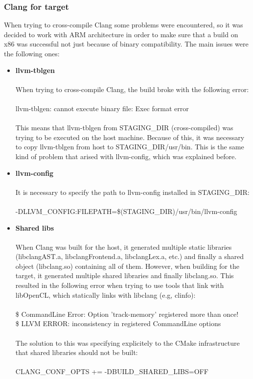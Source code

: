 \documentclass[12pt,a4paper,oneside]{article}
\begin{document}
\newpage
\subsubsection*{Clang for target}
When trying to cross-compile Clang some problems were encountered, so it was
decided to work with ARM architecture in order to make sure that a build on x86
was successful not just because of binary compatibility. The main issues were the
following ones:
\begin{itemize}
  \item \textbf{llvm-tblgen}\\\\
  When trying to cross-compile Clang, the build broke with the following error:\\\\
  {\selectfont llvm-tblgen: cannot execute binary file: Exec
  format error}\\\\
  This means that llvm-tblgen from STAGING\_DIR (cross-compiled) was trying to be
  executed on the host machine. Because of this, it was necessary to copy
  llvm-tblgen from host to STAGING\_DIR/usr/bin. This is the same kind of problem
  that arised with llvm-config, which was explained before.

  \item \textbf{llvm-config}\\\\
  It is necessary to specify the path to llvm-config installed in STAGING\_DIR:\\\\
  {\selectfont -DLLVM\_CONFIG:FILEPATH=\$(STAGING\_DIR)/usr/bin/llvm-config}

  \item \textbf{Shared libs}\\\\
  When Clang was built for the host, it generated multiple static libraries
  (libclangAST.a, libclangFrontend.a, libclangLex.a, etc.) and finally a shared
  object (libclang.so) containing all of them. However, when building for the
  target, it generated multiple shared libraries and finally libclang.so. This
  resulted in the following error when trying to use tools that link with
  libOpenCL, which statically links with libclang (e.g, clinfo):\\\\
  {\selectfont
  \$ CommandLine Error: Option 'track-memory' registered more than once!\\
  \$ LLVM ERROR: inconsistency in registered CommandLine options
  }\\\\
  The solution to this was specifying explicitely to the CMake infrastructure that
  shared libraries should not be built:\\\\
  {\selectfont CLANG\_CONF\_OPTS += -DBUILD\_SHARED\_LIBS=OFF}
\end{itemize}
\end{document}
